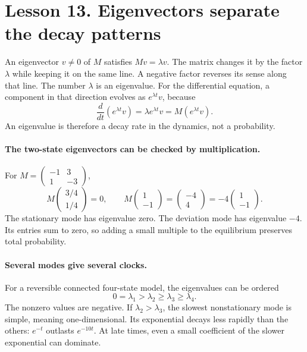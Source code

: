 \clearpage
\section*{Lesson 13. Eigenvectors separate the decay patterns}
An eigenvector $v\ne0$ of $M$ satisfies $Mv=\lambda v$. The matrix changes
it by the factor $\lambda$ while keeping it on the same line. A negative
factor reverses its sense along that line. The number
$\lambda$ is an eigenvalue. For the differential equation, a component in
that direction evolves as $e^{\lambda t}v$, because
\[
\frac{d}{dt}(e^{\lambda t}v)=\lambda e^{\lambda t}v
=M(e^{\lambda t}v).
\]
An eigenvalue is therefore a decay rate in the dynamics, not a probability.

\paragraph{The two-state eigenvectors can be checked by multiplication.}
For $M=\left(\begin{smallmatrix}-1&3\\1&-3\end{smallmatrix}\right)$,
\[
M\begin{pmatrix}3/4\\1/4\end{pmatrix}=0,
\qquad
M\begin{pmatrix}1\\-1\end{pmatrix}
=\begin{pmatrix}-4\\4\end{pmatrix}
=-4\begin{pmatrix}1\\-1\end{pmatrix}.
\]
The stationary mode has eigenvalue zero. The deviation mode has eigenvalue
$-4$. Its entries sum to zero, so adding a small multiple to the equilibrium
preserves total probability.

\paragraph{Several modes give several clocks.}
For a reversible connected four-state model, the eigenvalues can be ordered
\[
0=\lambda_1>\lambda_2\geq\lambda_3\geq\lambda_4.
\]
The nonzero values are negative. If $\lambda_2>\lambda_3$, the slowest
nonstationary mode is simple, meaning one-dimensional. Its exponential
decays less rapidly than the others: $e^{-t}$ outlasts $e^{-10t}$.
At late times, even a small coefficient of the slower exponential can dominate.

